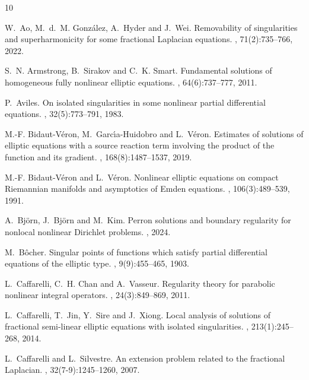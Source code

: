 \documentclass[11pt]{amsart}
\theoremstyle{plain}
\theoremstyle{definition}
\numberwithin{equation}{section}
\begin{document}
\begin{thebibliography}{10}

W.~Ao, M.~d.~M. Gonz\'alez, A.~Hyder and J.~Wei.
\newblock Removability of singularities and superharmonicity for some
  fractional {L}aplacian equations.
, 71(2):735--766, 2022.

S.~N. Armstrong, B.~Sirakov and C.~K. Smart.
\newblock Fundamental solutions of homogeneous fully nonlinear elliptic
  equations.
, 64(6):737--777, 2011.

P.~Aviles.
\newblock On isolated singularities in some nonlinear partial differential
  equations.
, 32(5):773--791, 1983.

M.-F. Bidaut-V\'{e}ron, M.~Garc\'{\i}a-Huidobro and L.~V\'{e}ron.
\newblock Estimates of solutions of elliptic equations with a source reaction
  term involving the product of the function and its gradient.
, 168(8):1487--1537, 2019.

M.-F. Bidaut-V\'eron and L.~V\'eron.
\newblock Nonlinear elliptic equations on compact {R}iemannian manifolds and
  asymptotics of {E}mden equations.
, 106(3):489--539, 1991.

A.~Bj{\"o}rn, J.~Bj{\"o}rn and M.~Kim.
\newblock Perron solutions and boundary regularity for nonlocal nonlinear
  {D}irichlet problems.
, 2024.

M.~B\^ocher.
\newblock Singular points of functions which satisfy partial differential
  equations of the elliptic type.
, 9(9):455--465, 1903.

L.~Caffarelli, C.~H. Chan and A.~Vasseur.
\newblock Regularity theory for parabolic nonlinear integral operators.
, 24(3):849--869, 2011.

L.~Caffarelli, T.~Jin, Y.~Sire and J.~Xiong.
\newblock Local analysis of solutions of fractional semi-linear elliptic
  equations with isolated singularities.
, 213(1):245--268, 2014.

L.~Caffarelli and L.~Silvestre.
\newblock An extension problem related to the fractional {L}aplacian.
, 32(7-9):1245--1260, 2007.


\end{thebibliography}
\end{document}
